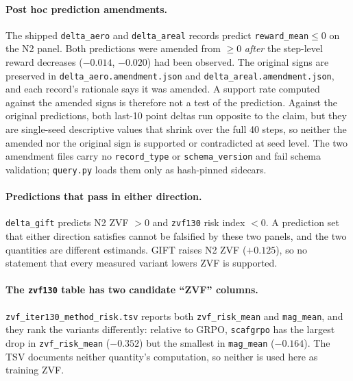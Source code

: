 \paragraph{Post hoc prediction amendments.} The shipped \texttt{delta\_aero}
and \texttt{delta\_areal} records predict \texttt{reward\_mean}${}\le 0$ on the
N2 panel. Both predictions were amended from ${}\ge 0$ \emph{after} the
step-level reward decreases ($-0.014$, $-0.020$) had been observed. The
original signs are preserved in \texttt{delta\_aero.amendment.json} and
\texttt{delta\_areal.amendment.json}, and each record's rationale says it was
amended. A support rate computed against the amended signs is therefore not a
test of the prediction. Against the original predictions, both last-10
point deltas run opposite to the claim, but they are single-seed descriptive
values that shrink over the full 40 steps, so neither the amended nor the
original sign is supported or contradicted at seed level. The two amendment
files carry no \texttt{record\_type} or \texttt{schema\_version} and fail
schema validation; \texttt{query.py} loads them only as hash-pinned sidecars.

\paragraph{Predictions that pass in either direction.} \texttt{delta\_gift}
predicts N2 ZVF ${}>0$ and \texttt{zvf130} risk index ${}<0$. A prediction set
that either direction satisfies cannot be falsified by these two panels, and
the two quantities are different estimands. GIFT raises N2 ZVF ($+0.125$), so
no statement that every measured variant lowers ZVF is supported.

\paragraph{The \texttt{zvf130} table has two candidate ``ZVF'' columns.}
\texttt{zvf\_iter130\_method\_risk.tsv} reports both \texttt{zvf\_risk\_mean}
and \texttt{mag\_mean}, and they rank the variants differently: relative to
GRPO, \texttt{scafgrpo} has the largest drop in \texttt{zvf\_risk\_mean}
($-0.352$) but the smallest in \texttt{mag\_mean} ($-0.164$). The TSV
documents neither quantity's computation, so neither is used here as training
ZVF.

\endinput %

